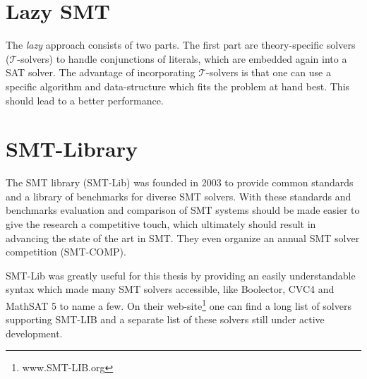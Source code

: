 \section{Lazy SMT}
The \textit{lazy} approach consists of two parts. The first part are theory-specific solvers ($\mathcal{T}$-solvers) to handle conjunctions of literals, which are embedded again into a SAT solver. The advantage of incorporating $\mathcal{T}$-solvers is that one can use a specific algorithm and data-structure which fits the problem at hand best. This should lead to a better performance.~\cite{sebastiani2007lazy}

\section{SMT-Library}
The SMT library (SMT-Lib) was founded in 2003 to provide common standards and a library of benchmarks for diverse SMT solvers. With these standards and benchmarks evaluation and comparison of SMT systems should be made easier to give the research a competitive touch, which ultimately should result in advancing the state of the art in SMT. They even organize an annual SMT solver competition (SMT-COMP).

SMT-Lib was greatly useful for this thesis by providing an easily understandable syntax which made many SMT solvers accessible, like Boolector, CVC4 and MathSAT 5 to name a few. On their web-site\footnote{www.SMT-LIB.org} one can find a long list of solvers supporting SMT-LIB and a separate list of these solvers still under active development.

